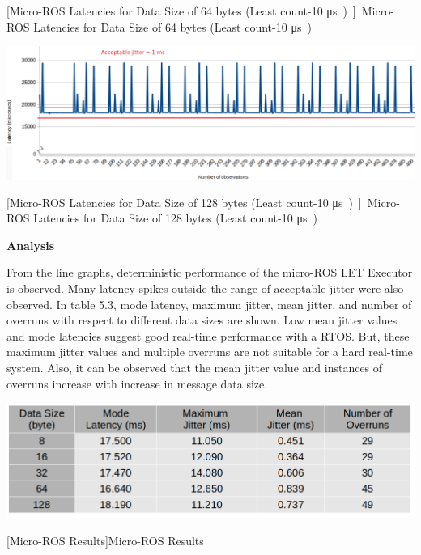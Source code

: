 \documentclass[%
xelatex,
	oneside,		%
	12pt,			%
	parskip=half,	%
	abstracton,
	chapterprefix=true%
    appendixprefix=true]
{scrbook}
\begin{document}
\begin{itemize}
\begin{center}
[Micro-ROS Latencies for Data Size of 64 bytes (Least count-10 \si\micro s)]{Micro-ROS Latencies for Data Size of 64 bytes (Least count-10 \si\micro s)}
\label{fig:uros64byte}
\end{center}

\begin{center}
\includegraphics[scale=0.34]{fig/uros128byte2.png}

[Micro-ROS Latencies for Data Size of 128 bytes (Least count-10 \si\micro s)]{Micro-ROS Latencies for Data Size of 128 bytes (Least count-10 \si\micro s)}
\label{fig:uros128byte}
\end{center}
\end{itemize}
{\bfseries Analysis}


\vspace*{0.5cm}
From the line graphs, deterministic performance of the micro-ROS LET Executor is observed. Many latency spikes outside the range of acceptable jitter were also observed. In table 5.3, mode latency, maximum jitter, mean jitter, and number of overruns with respect to different data sizes are shown. Low mean jitter values and mode latencies suggest good real-time performance with a RTOS. But, these maximum jitter values and multiple overruns are not suitable for a hard real-time system. Also, it can be observed that the mean jitter value and instances of overruns increase with increase in message data size.
\begin{center}
\includegraphics[scale=0.4]{fig/urosfinaldata.png}

[Micro-ROS Results]{Micro-ROS Results}
\label{tab:urosfinaldata}
\end{center}
		
\end{document}
